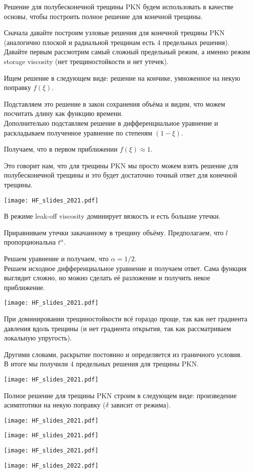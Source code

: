 \documentclass[main.tex]{subfiles}
\begin{document}
Решение для полубесконечной трещины PKN будем использовать в качестве основы, чтобы построить полное решение для конечной трещины.

Сначала давайте построим узловые решения для конечной трещины PKN (аналогично плоской и радиальной трещинам есть 4 предельных решения).
\\

Давайте первым рассмотрим самый сложный предельный режим, а именно режим storage viscosity (нет трещиностойкости и нет утечек).

Ищем решение в следующем виде: решение на кончике, умноженное на некую поправку $f(\xi)$.

Подставляем это решение в закон сохранения объёма и видим, что можем посчитать длину как функцию времени.
\\

Дополнительно подставляем решение в дифференциальное уравнение и раскладываем полученное уравнение по степеням $(1-\xi)$.

Получаем, что в первом приближении $f(\xi)\approx1$.

Это говорит нам, что для трещины PKN мы просто можем взять решение для полубесконечной трещины и это будет достаточно точный ответ для конечной трещины.

\texttt{[image: HF\_slides\_2021.pdf]}

В режиме leak-off viscosity доминирует вязкость и есть большие утечки.

Приравниваем утечки закачанному в трещину объёму.
Предполагаем, что $l$ пропорциональна $t^\alpha$.

Решаем уравнение и получаем, что $\alpha=1/2$.
\\

Решаем исходное дифференциальное уравнение и получаем ответ.
Сама функция выглядит сложно, но можно сделать её разложение и получить некое приближение.

\texttt{[image: HF\_slides\_2021.pdf]}

При доминировании трещиностойкости всё гораздо проще, так как нет градиента давления вдоль трещины (и нет градиента открытия, так как рассматриваем локальную упругость).

Другими словами, раскрытие постоянно и определяется из граничного условия.
\\

В итоге мы получили 4 предельных решения для трещины PKN.

\texttt{[image: HF\_slides\_2021.pdf]}

Полное решение для трещины PKN строим в следующем виде: произведение асимптотики на некую поправку ($\delta$ зависит от режима).

\texttt{[image: HF\_slides\_2021.pdf]}

\texttt{[image: HF\_slides\_2021.pdf]}

\texttt{[image: HF\_slides\_2021.pdf]}

\texttt{[image: HF\_slides\_2022.pdf]}
\end{document}
